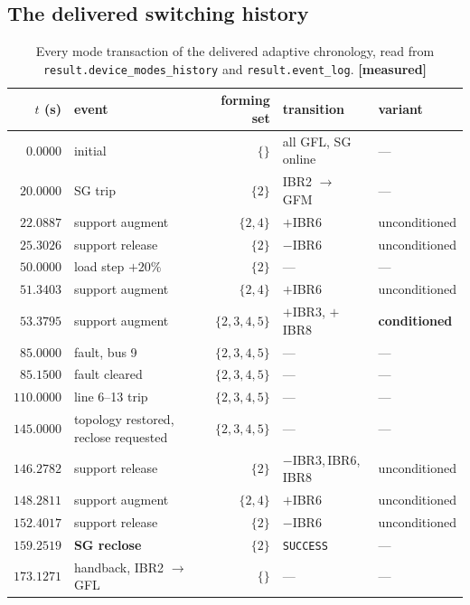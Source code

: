 \documentclass[12pt,a4paper]{article}
\theoremstyle{remark}
\newcommand{\code}[1]{\texttt{\small #1}}
\newcommand{\measured}{\textcolor{ok}{\textbf{[measured]}}}
\begin{document}
\subsection{The delivered switching history}

\begin{table}[H]
\centering
\small
\begin{tabular}{@{}rlrll@{}}
\toprule
$t$ (s) & \textbf{event} & \textbf{forming set} & \textbf{transition} & \textbf{variant}\\
\midrule
$0.0000$    & initial              & $\{\}$               & all GFL, SG online & ---\\
$20.0000$   & SG trip              & $\{2\}$              & IBR2 $\to$ GFM     & ---\\
$22.0887$   & support augment      & $\{2,4\}$            & $+$IBR6            & unconditioned\\
$25.3026$   & support release      & $\{2\}$              & $-$IBR6            & unconditioned\\
$50.0000$   & load step $+20\%$    & $\{2\}$              & ---                & ---\\
$51.3403$   & support augment      & $\{2,4\}$            & $+$IBR6            & unconditioned\\
$53.3795$   & support augment      & $\{2,3,4,5\}$        & $+$IBR3, $+$IBR8   & \textbf{conditioned}\\
$85.0000$   & fault, bus 9         & $\{2,3,4,5\}$        & ---                & ---\\
$85.1500$   & fault cleared        & $\{2,3,4,5\}$        & ---                & ---\\
$110.0000$  & line 6--13 trip      & $\{2,3,4,5\}$        & ---                & ---\\
$145.0000$  & topology restored, reclose requested & $\{2,3,4,5\}$ & --- & ---\\
$146.2782$  & support release      & $\{2\}$              & $-$IBR3,\,IBR6,\,IBR8 & unconditioned\\
$148.2811$  & support augment      & $\{2,4\}$            & $+$IBR6            & unconditioned\\
$152.4017$  & support release      & $\{2\}$              & $-$IBR6            & unconditioned\\
$159.2519$  & \textbf{SG reclose}  & $\{2\}$              & \code{SUCCESS}     & ---\\
$173.1271$  & handback, IBR2 $\to$ GFL & $\{\}$           & ---                & ---\\
\bottomrule
\end{tabular}
\caption{Every mode transaction of the delivered adaptive chronology, read from
\code{result.device\_modes\_history} and \code{result.event\_log}.
\measured}
\label{tab:timeline}
\end{table}
\end{document}
